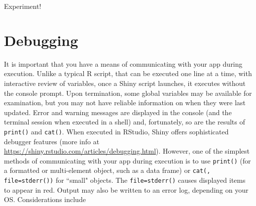 \documentclass[10pt, letterpaper]{article}
\begin{document}
\begin{spacing}{1.0}
Experiment!


\section{Debugging}\label{sec:debug}

It is important that you have a means of communicating with your app during execution.  Unlike a typical R script, that can be executed one line at a time, with interactive review of variables, once a Shiny script launches, it executes without the console prompt.  Upon termination, some global variables may be available for examination, but you may not have reliable information on when they were last updated.  Error and warning messages are displayed in the console (and the terminal session when executed in a shell) and, fortunately, so are the results of \texttt{print()} and \texttt{cat()}.  When executed in RStudio, Shiny offers sophisticated debugger features (more info at \url{https://shiny.rstudio.com/articles/debugging.html}).  However, one of the simplest methods of communicating with your app during execution is to use \texttt{print()} (for a formatted or multi-element object, such as a data frame) or \texttt{cat(, file=stderr())} for ``small" objects.  The \texttt{file=stderr()} causes displayed items to appear in red.  Output may also be written to an error log, depending on your OS.  Considerations include


\end{spacing}
\end{document}
